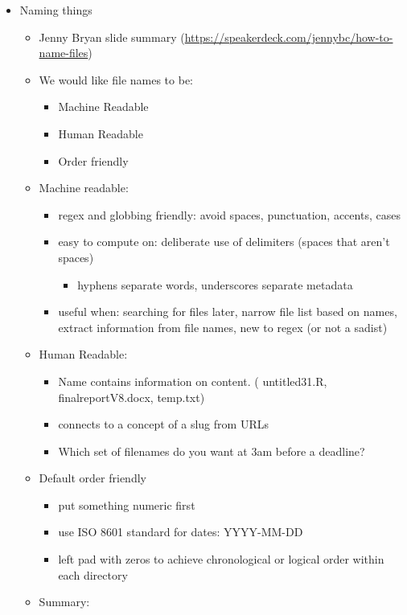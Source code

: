 \documentclass[
  12pt,
]{book}
\providecommand{\tightlist}{%
  \setlength{\itemsep}{0pt}\setlength{\parskip}{0pt}}
\theoremstyle{definition}
\theoremstyle{definition}
\theoremstyle{definition}
\theoremstyle{definition}
\theoremstyle{remark}
\begin{document}
\begin{itemize}
\tightlist
\item
  Naming things

  \begin{itemize}
  \item
    Jenny Bryan slide summary (\url{https://speakerdeck.com/jennybc/how-to-name-files})
  \item
    We would like file names to be:

    \begin{itemize}
    \tightlist
    \item
      Machine Readable
    \item
      Human Readable
    \item
      Order friendly
    \end{itemize}
  \item
    Machine readable:

    \begin{itemize}
    \tightlist
    \item
      regex and globbing friendly: avoid spaces, punctuation, accents, cases
    \item
      easy to compute on: deliberate use of delimiters (spaces that aren't spaces)

      \begin{itemize}
      \tightlist
      \item
        hyphens separate words, underscores separate metadata
      \end{itemize}
    \item
      useful when: searching for files later, narrow file list based on names, extract information from file names, new to regex (or not a sadist)
    \end{itemize}
  \item
    Human Readable:

    \begin{itemize}
    \tightlist
    \item
      Name contains information on content. ( untitled31.R, finalreportV8.docx, temp.txt)
    \item
      connects to a concept of a slug from URLs
    \item
      Which set of filenames do you want at 3am before a deadline?
    \end{itemize}
  \item
    Default order friendly

    \begin{itemize}
    \tightlist
    \item
      put something numeric first
    \item
      use ISO 8601 standard for dates: YYYY-MM-DD
    \item
      left pad with zeros to achieve chronological or logical order within each directory
    \end{itemize}
  \item
    Summary:


\end{itemize}
\end{itemize}
\end{document}
